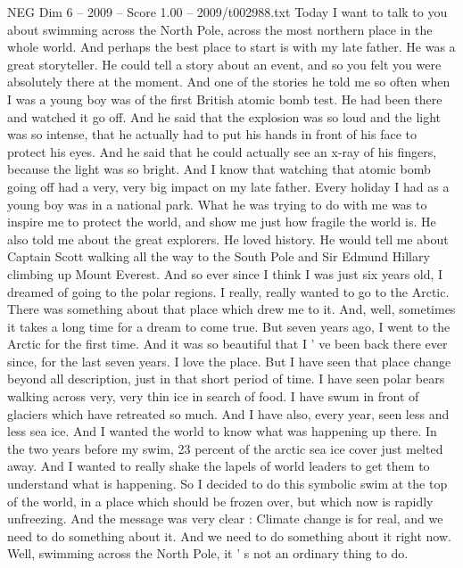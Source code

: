 \begin{textsample}{NEG Dim 6 – 2009 – Score 1.00 – 2009/t002988.txt}  \label{ex:f6_neg_050}
Today I want to talk to you about swimming across the North Pole, across the most northern place in the whole world.
And perhaps the best place to start is with my late father.
He was a great storyteller.
He could tell a story about an event, and so you felt you were absolutely there at the moment.
And one of the stories he told me so often when I was a young boy was of the first British atomic bomb test.
He had been there and watched it go off.
And he said that the explosion was so loud and the light was so intense, that he actually had to put his hands in front of his face to protect his eyes.
And he said that he could actually see an x-ray of his fingers, because the light was so bright.
And I know that watching that atomic bomb going off had a very, very big impact on my late father.
Every holiday I had as a young boy was in a national park.
What he was trying to do with me was to inspire me to protect the world, and show me just how fragile the world is.
He also told me about the great explorers.
He loved history.
He would tell me about Captain Scott walking all the way to the South Pole and Sir Edmund Hillary climbing up Mount Everest.
And so ever since I think I was just six years old, I dreamed of going to the polar regions.
I really, really wanted to go to the Arctic.
There was something about that place which drew me to it.
And, well, sometimes it takes a long time for a dream to come true.
But seven years ago, I went to the Arctic for the first time.
And it was so beautiful that I ' ve been back there ever since, for the last seven years.
I love the place.
But I have seen that place change beyond all description, just in that short period of time.
I have seen polar bears walking across very, very thin ice in search of food.
I have swum in front of glaciers which have retreated so much.
And I have also, every year, seen less and less sea ice.
And I wanted the world to know what was happening up there.
In the two years before my swim, 23 percent of the arctic sea ice cover just melted away.
And I wanted to really shake the lapels of world leaders to get them to understand what is happening.
So I decided to do this symbolic swim at the top of the world, in a place which should be frozen over, but which now is rapidly unfreezing.
And the message was very clear : Climate change is for real, and we need to do something about it.
And we need to do something about it right now.
Well, swimming across the North Pole, it ' s not an ordinary thing to do.

\end{textsample}
